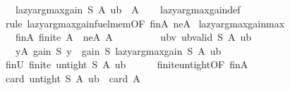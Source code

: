 \begin{isabellebody}
\ \ \ {\isachardoublequoteopen}lazy{\isacharunderscore}{\kern0pt}argmax{\isacharunderscore}{\kern0pt}gain\ S\ A\ ub\ {\isasymin}\ A{\isachardoublequoteclose}\isanewline
%
\isadelimproof
\ \ %
\endisadelimproof
%
\isatagproof
{}\isamarkupfalse%
\ lazy{\isacharunderscore}{\kern0pt}argmax{\isacharunderscore}{\kern0pt}gain{\isacharunderscore}{\kern0pt}def\isanewline
\ \ \isamarkupfalse%
\ {\isacharparenleft}{\kern0pt}rule\ lazy{\isacharunderscore}{\kern0pt}argmax{\isacharunderscore}{\kern0pt}gain{\isacharunderscore}{\kern0pt}fuel{\isacharunderscore}{\kern0pt}mem{\isacharbrackleft}{\kern0pt}OF\ finA\ neA{\isacharbrackright}{\kern0pt}{\isacharparenright}{\kern0pt}%
\endisatagproof
{\isafoldproof}%
%
\isadelimproof
\isanewline
%
\endisadelimproof
\isanewline
{}\isamarkupfalse%
\ lazy{\isacharunderscore}{\kern0pt}argmax{\isacharunderscore}{\kern0pt}gain{\isacharunderscore}{\kern0pt}max{\isacharcolon}{\kern0pt}\isanewline
\ \ \ finA{\isacharcolon}{\kern0pt}\ {\isachardoublequoteopen}finite\ A{\isachardoublequoteclose}\ \ neA{\isacharcolon}{\kern0pt}\ {\isachardoublequoteopen}A\ {\isasymnoteq}\ {\isacharbraceleft}{\kern0pt}{\isacharbraceright}{\kern0pt}{\isachardoublequoteclose}\isanewline
\ \ \ \ \ \ \ ubv{\isacharcolon}{\kern0pt}\ {\isachardoublequoteopen}ub{\isacharunderscore}{\kern0pt}valid\ S\ A\ ub{\isachardoublequoteclose}\isanewline
\ \ \ {\isachardoublequoteopen}{\isasymforall}y{\isasymin}A{\isachardot}{\kern0pt}\ gain\ S\ y\ {\isasymle}\ gain\ S\ {\isacharparenleft}{\kern0pt}lazy{\isacharunderscore}{\kern0pt}argmax{\isacharunderscore}{\kern0pt}gain\ S\ A\ ub{\isacharparenright}{\kern0pt}{\isachardoublequoteclose}\isanewline
%
\isadelimproof
%
\endisadelimproof
%
\isatagproof
{}\isamarkupfalse%
\ {\isacharminus}{\kern0pt}\isanewline
\ \ \isamarkupfalse%
\ finU{\isacharcolon}{\kern0pt}\ {\isachardoublequoteopen}finite\ {\isacharparenleft}{\kern0pt}untight\ S\ A\ ub{\isacharparenright}{\kern0pt}{\isachardoublequoteclose}\isanewline
\ \ \ \ \isamarkupfalse%
\ finite{\isacharunderscore}{\kern0pt}untight{\isacharbrackleft}{\kern0pt}OF\ finA{\isacharbrackright}{\kern0pt}\ \isakeywordONE{{\isachardot}{\kern0pt}}\isamarkupfalse%
\isanewline
\ \ \isamarkupfalse%
\ {\isachardoublequoteopen}card\ {\isacharparenleft}{\kern0pt}untight\ S\ A\ ub{\isacharparenright}{\kern0pt}\ {\isasymle}\ card\ A{\isachardoublequoteclose}\isanewline

\end{isabellebody}
